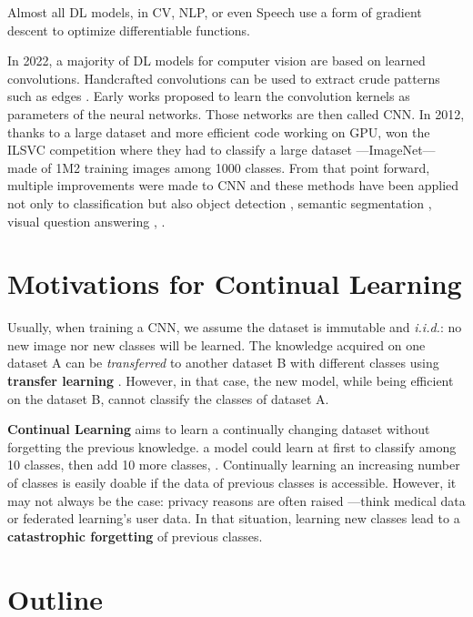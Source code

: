Almost all \ac{DL} models, in \ac{CV}, \ac{NLP}, or even Speech use a form of gradient descent to
optimize differentiable functions.

In 2022, a majority of \ac{DL} models for computer vision are based on learned convolutions.
Handcrafted convolutions can be used to extract crude patterns such as edges \citep{lowe1999sift}.
Early works proposed to learn the convolution kernels
\citep{fukushima1980neocognitron,lecun1999lenet} as parameters of the neural networks. Those networks
are then called \ac{CNN}. In 2012, thanks to a large dataset and more efficient code working on
\acs{GPU}, \cite{krizhevsky2012alexnet} won the ILSVC competition
\citep{russakovsky2015imagenet_ilsvrc} where they had to classify a large dataset ---ImageNet---
made of 1M2 training images among 1000 classes. From that point forward, multiple improvements were
made to \ac{CNN} \citep{ioffe2015batchnorm,he2016resnet} and these methods have been applied not only
to classification but also object detection \citep{ren20fasterrcnn}, semantic segmentation
\citep{chen2018deeplab}, visual question answering \citep{benyounes2017mutan}, \etc.

\section{Motivations for Continual Learning}

Usually, when training a \ac{CNN}, we assume the dataset is immutable and \textit{i.i.d.}: no new
image nor new classes will be learned. The knowledge acquired on one dataset A can be
\textit{transferred} to another dataset B with different classes using \textbf{transfer learning}
\citep{razavian2014transferlearning}. However, in that case, the new model, while being efficient on
the dataset B, cannot classify the classes of dataset A.

\textbf{Continual Learning} aims to learn a continually changing dataset without forgetting the
previous knowledge. \eg a model could learn at first to classify among 10 classes, then add 10 more
classes, \etc. Continually learning an increasing number of classes is easily doable if the data of
previous classes is accessible. However, it may not always be the case: privacy reasons are often
raised ---think medical data or federated learning's user data. In that situation, learning new
classes lead to a \textbf{catastrophic forgetting} \citep{robins1995catastrophicforgetting} of
previous classes.

\section{Outline}

